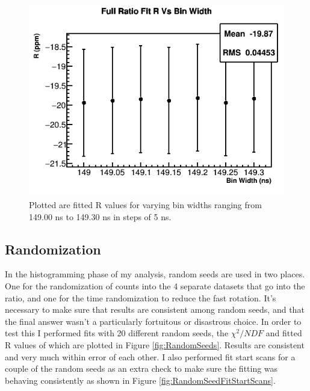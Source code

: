 		\begin{figure}[]
			\centering
			\includegraphics[width=.6\textwidth]{BinWidthComparison_R}
		    \caption[BinWidth]{Plotted are fitted R values for varying bin widths ranging from 149.00 ns to 149.30 ns in steps of 5 ns.}
		    \label{fig:BinWidth}
		\end{figure}

	\subsection{Randomization}

		In the histogramming phase of my analysis, random seeds are used in two places. One for the randomization of counts into the 4 separate datasets that go into the ratio, and one for the time randomization to reduce the fast rotation. It's necessary to make sure that results are consistent among random seeds, and that the final answer wasn't a particularly fortuitous or disastrous choice. In order to test this I performed fits with 20 different random seeds, the $\chi^{2}/NDF$ and fitted R values of which are plotted in Figure \ref{fig:RandomSeeds}. Results are consistent and very much within error of each other. I also performed fit start scans for a couple of the random seeds as an extra check to make sure the fitting was behaving consistently as shown in Figure \ref{fig:RandomSeedFitStartScans}.

